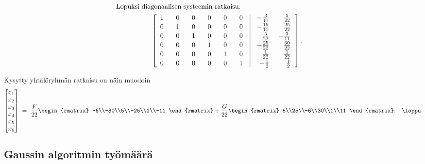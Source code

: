 \begin{align*}
\intertext{Lopuksi diagonaalisen systeemin ratkaisu:}
&\phantom{(k=2)} \qquad 
              \left[\begin{array}{rrrrrr} 
                    1&\,\ \ 0&\,\ \ 0&\,\ \ 0&\,\ \ 0&\,\ \ 0\\[0.5mm] 0&1&0&0&0&0\\[0.5mm] 
                    0&0&1&0&0&0\\[0.5mm]
                    0&0&0&1&0&0\\[0.5mm] 0&0&0&0&1&0\\[0.5mm] 0&0&0&0&0&1 
                    \end{array} \right.
       \left. \left|\begin{array}{rr}
                    -\frac{3}{11}&\frac{5}{22}\\[0.5mm]-\frac{15}{11}&\frac{25}{22}\\[0.5mm]
                    \frac{5}{22}&\ -\frac{3}{11}\\[0.5mm]\ -\frac{25}{22}&\frac{30}{22}\\[0.5mm]
                    \frac{1}{22}&\frac{1}{22}\\[0.5mm]-\frac{1}{2}&\frac{1}{2}
                    \end{array} \right. \right].
\end{align*}

Kysytty yhtälöryhmän ratkaisu on näin muodoin
\[ 
\begin{bmatrix} x_1\\x_2\\x_3\\x_4\\x_5\\x_6 \end{bmatrix}\ =\
               \frac{F}{22} \begin{rmatrix} -6\\-30\\5\\-25\\1\\-11 \end{rmatrix}
              +\frac{G}{22} \begin{rmatrix} 5\\25\\-6\\30\\1\\11 \end{rmatrix}. \quad \loppu
\]

\subsection{Gaussin algoritmin työmäärä}

